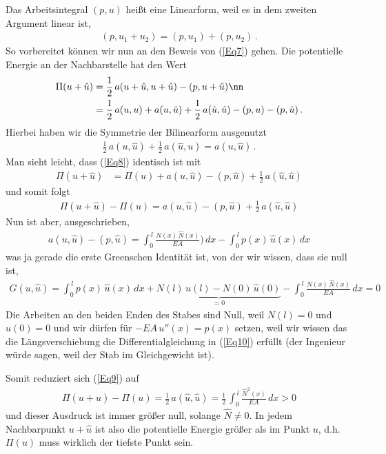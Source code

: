 Das Arbeitsintegral $(p,u)$ hei{\ss}t eine Linearform, weil es in dem zweiten Argument linear ist,
\begin{align}
(p,u_1 + u_2) = (p,u_1) + (p,u_2)\,.
\end{align}
So vorbereitet k\"{o}nnen wir nun an den Beweis von (\ref{Eq7}) gehen. Die potentielle Energie an der Nachbarstelle hat den Wert
\begin{align} \label{Eq8}
\Pi(u + \hat{u}) &= \frac{1}{2}\,a(u + \hat{u},u + \hat{u}) - (p,u + \hat{u}) \nn \\
&= \frac{1}{2}\,a(u,u) + a(u,\hat{u}) + \frac{1}{2}\, a(\hat{u},\hat{u}) - (p,u) - (p,\hat{u})\,.
\end{align}
Hierbei haben wir die Symmetrie der Bilinearform ausgenutzt
\begin{align}
\frac{1}{2}\, a(u,\hat{u}) + \frac{1}{2}\, a(\hat{u},u)  = a(u,\hat{u})\,.
\end{align}
Man sieht leicht, dass (\ref{Eq8}) identisch ist mit
\begin{align}
\Pi(u + \hat{u}) &=\Pi(u) + a(u,\hat{u}) - (p,\hat{u}) + \frac{1}{2}\, a(\hat{u},\hat{u})
\end{align}
und somit folgt
\begin{align} \label{Eq9}
\Pi(u + \hat{u}) -\Pi(u) = a(u,\hat{u}) - (p,\hat{u})+ \frac{1}{2}\, a(\hat{u},\hat{u})
\end{align}
Nun ist aber, ausgeschrieben,
\begin{align}
a(u, \hat{u}) - (p,\hat{u}) = \int_0^{\,l} \frac{N(x)\,\hat{N}(x)}{EA})\,dx - \int_0^{\,l} p(x)\,\hat{u}(x)\,dx
\end{align}
was ja gerade die erste Greenschen Identit\"{a}t ist, von der wir wissen, dass sie null ist,
\begin{align}
G(u,\hat{u}) = \int_0^{\,l} p(x)\,\hat{u}(x)\,dx + \underbrace{N(l)\,\hat{u}(l) - N(0)\,\hat{u}(0)}_{= 0} - \int_0^{\,l} \frac{N(x)\,\hat{N}(x)}{EA}\,dx = 0
\end{align}
Die Arbeiten an den beiden Enden des Stabes sind Null, weil $N(l) = 0$ und $\hat{u}(0)= 0$ und wir d\"{u}rfen f\"{u}r $- EA\,u''(x) = p(x)$ setzen, weil wir wissen das die L\"{a}ngsverschiebung die Differentialgleichung in (\ref{Eq10}) erf\"{u}llt (der Ingenieur w\"{u}rde sagen, weil der Stab im Gleichgewicht ist).

Somit reduziert sich (\ref{Eq9}) auf
\begin{align}
\Pi(u + \hat{u}) -\Pi(u) = \frac{1}{2}\, a(\hat{u},\hat{u}) = \frac{1}{2}\, \int_0^{\,l} \frac{\hat{N}^2(x)}{EA}\,dx > 0
\end{align}
und dieser Ausdruck ist immer gr\"{o}{\ss}er null, solange $\hat{N} \neq 0$. In jedem Nachbarpunkt $u + \hat{u} $ ist also die potentielle Energie gr\"{o}{\ss}er als im Punkt $u$, d.h. $\Pi(u)$ muss wirklich der tiefste Punkt sein.

